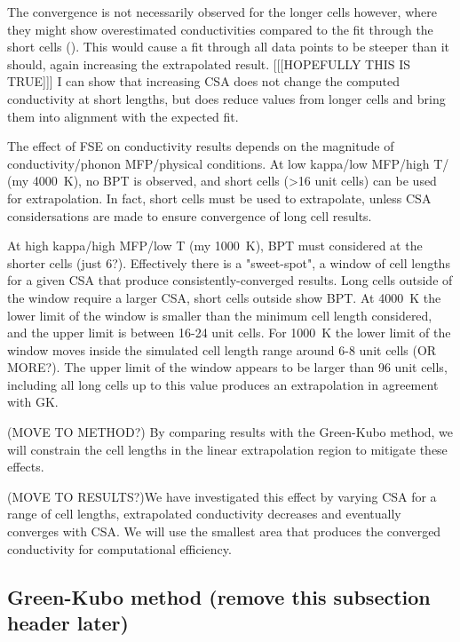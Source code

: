 \documentclass[%
preprint,                                  %
nofootinbib,
 amsmath,amssymb,
 aps,
]{revtex4-1}
\begin{document}
The convergence is not necessarily observed for the longer cells however, where they might show overestimated conductivities compared to the fit through the short cells (\cite{Hu2011}). This would cause a fit through all data points to be steeper than it should, again increasing the extrapolated result.  [[[HOPEFULLY THIS IS TRUE]]] I can show that increasing CSA does not change the computed conductivity at short lengths, but does reduce values from longer cells and bring them into alignment with the expected fit.

The effect of FSE on conductivity results depends on the magnitude of conductivity/phonon MFP/physical conditions. At low kappa/low MFP/high T/ (my 4000~K), no BPT is observed, and short cells (>16 unit cells) can be used for extrapolation. In fact, short cells must be used to extrapolate, unless CSA considersations are made to ensure convergence of long cell results.

At high kappa/high MFP/low T (my 1000~K), BPT must considered at the shorter cells (just 6?). Effectively there is a "sweet-spot", a window of cell lengths for a given CSA that produce consistently-converged results. Long cells outside of the window require a larger CSA, short cells outside show BPT. At 4000~K the lower limit of the window is smaller than the minimum cell length considered, and the upper limit is between 16-24 unit cells. For 1000~K the lower limit of the window moves inside the simulated cell length range around 6-8 unit cells (OR MORE?). The upper limit of the window appears to be larger than 96 unit cells, including all long cells up to this value produces an extrapolation in agreement with GK.



(MOVE TO METHOD?) By comparing results with the Green-Kubo method, we will constrain the cell lengths in the linear extrapolation region to mitigate these effects. 

(MOVE TO RESULTS?)We have investigated this effect by varying CSA for a range of cell lengths, extrapolated conductivity decreases and eventually converges with CSA. We will use the smallest area that produces the converged conductivity for computational efficiency. 









\subsection{\label{sec:theory.gk}Green-Kubo method (remove this subsection header later)}
\end{document}
